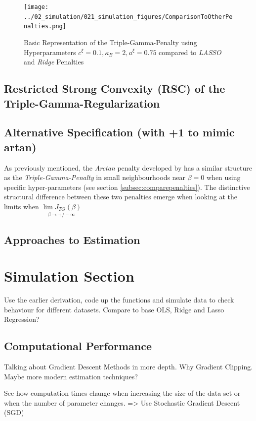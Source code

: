 \documentclass[12pt,a4paper]{article}
\begin{document}
\begin{figure}[!h]
\centering
\texttt{[image: ../02\_simulation/021\_simulation\_figures/ComparisonToOtherPenalties.png]}
\caption{Basic Representation of the Triple-Gamma-Penalty using Hyperparameters $c^\xi = 0.1, \kappa_B = 2, a^\xi = 0.75$ compared to \textit{LASSO} and \textit{Ridge} Penalties}
\label{fig:basicTGPen}
\end{figure}

\subsection{Restricted Strong Convexity (RSC) of the Triple-Gamma-Regularization}

\subsection{Alternative Specification (with +1 to mimic artan)}

As previously mentioned, the \textit{Arctan} penalty developed by \textcite{WangZhu2016} has a similar structure as the \textit{Triple-Gamma-Penalty} in small neighbourhoods near $\beta = 0$ when using specific hyper-parameters (see section \ref{subsec:comparepenalties}). The distinctive structural difference between these two penalties emerge when looking at the limits when  $\underset{\beta \to +/- \infty}{\lim J_{TG}(\beta)}$

\subsection{Approaches to Estimation}

\section{Simulation Section}
Use the earlier derivation, code up the functions and simulate data to check behaviour for different datasets. Compare to base OLS, Ridge and Lasso Regression?
\subsection{Computational Performance}
Talking about Gradient Descent Methods in more depth. Why Gradient Clipping. Maybe more modern estimation techniques? 

See how computation times change when increasing the size of the data set or when the number of parameter changes. => Use Stochastic Gradient Descent (SGD)
\end{document}
